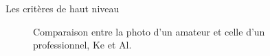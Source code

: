 \documentclass{beamer}
\begin{document}
\begin{frame}{Les critères de haut niveau}

\begin{figure}[htp]
 \centering
 \caption{Comparaison entre la photo d'un amateur et celle d'un professionnel, Ke et Al.}
 \label{fig:ComparaisonPhotosAmateurPro}
\end{figure}

\end{frame}
\end{document}

